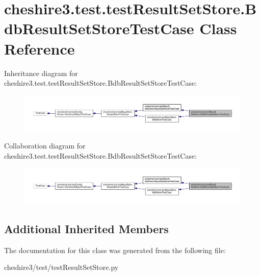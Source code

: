 \hypertarget{classcheshire3_1_1test_1_1test_result_set_store_1_1_bdb_result_set_store_test_case}{\section{cheshire3.\-test.\-test\-Result\-Set\-Store.\-Bdb\-Result\-Set\-Store\-Test\-Case Class Reference}
\label{classcheshire3_1_1test_1_1test_result_set_store_1_1_bdb_result_set_store_test_case}
}


Inheritance diagram for cheshire3.\-test.\-test\-Result\-Set\-Store.\-Bdb\-Result\-Set\-Store\-Test\-Case\-:
\nopagebreak
\begin{figure}[H]
\begin{center}
\leavevmode
\includegraphics[width=350pt]{classcheshire3_1_1test_1_1test_result_set_store_1_1_bdb_result_set_store_test_case__inherit__graph}
\end{center}
\end{figure}


Collaboration diagram for cheshire3.\-test.\-test\-Result\-Set\-Store.\-Bdb\-Result\-Set\-Store\-Test\-Case\-:
\nopagebreak
\begin{figure}[H]
\begin{center}
\leavevmode
\includegraphics[width=350pt]{classcheshire3_1_1test_1_1test_result_set_store_1_1_bdb_result_set_store_test_case__coll__graph}
\end{center}
\end{figure}
\subsection*{Additional Inherited Members}


The documentation for this class was generated from the following file\-:\begin{DoxyCompactItemize}
\item 
cheshire3/test/test\-Result\-Set\-Store.\-py\end{DoxyCompactItemize}
